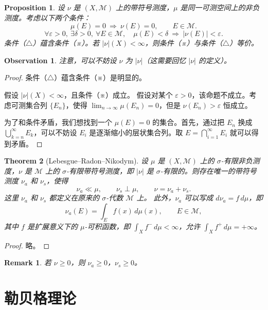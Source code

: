 \documentclass[12pt,letterpaper,twoside,openright]{ctexbook}
\theoremstyle{bluehead}
\newtheorem{theorem}{Theorem}
\newtheorem{proposition}[theorem]{Proposition}
\theoremstyle{olivehead}
\theoremstyle{orangehead}
\theoremstyle{redremark}
\newtheorem*{remark}{Remark}
\newtheorem*{observation}{Observation}
\begin{document}
\begin{proposition}
设 $\nu$ 是 $(X,\mathcal M)$ 上的带符号测度，$\mu$ 是同一可测空间上的非负测度。考虑以下两个条件：
\begin{equation*}
\mu(E)=0\ \Longrightarrow\ \nu(E)=0,
\qquad E\in\mathcal M.\tag{※}
\end{equation*}
\begin{equation*}
\forall\varepsilon>0,\ \exists\delta>0,\ \forall E\in\mathcal M,
\quad\mu(E)<\delta\ \Longrightarrow\ |\nu(E)|<\varepsilon.\tag{$\triangle$}
\end{equation*}
条件（$\triangle$）蕴含条件（※）。若 $|\nu|(X)<\infty$，则条件（※）与条件（$\triangle$）等价。
\end{proposition}
\begin{observation}
注意，可以不妨设 $\nu$ 为 $|\nu|$（这需要回忆 $|\nu|$ 的定义）。
\end{observation}
\begin{proof}
条件（$\triangle$）蕴含条件（※）是明显的。

假设 $|\nu|(X)<\infty$，且条件（※）成立。
假设对某个 $\varepsilon>0$，该命题不成立。考虑可测集合列 $\{E_n\}$，使得 $\lim_{n\to\infty}\mu(E_n)=0$，但是 $\nu(E_n)>\varepsilon$ 恒成立。

为了和条件矛盾，我们想找到一个 $\mu(E)=0$ 的集合。首先，通过把 $E_n$ 换成 $\bigcup_{k=n}^{\infty}E_k$，可以不妨设 $E_i$ 是逐渐缩小的层状集合列。取 $E=\bigcap_{i=1}^{\infty}E_i$ 就可以得到矛盾。
\end{proof}
\begin{theorem}[Lebesgue--Radon--Nikodym]\label{thm:lebesgue-radon-nikodym}
设 $\mu$ 是 $(X,\mathcal M)$ 上的 $\sigma$-有限非负测度，$\nu$ 是 $\mathcal M$ 上的 $\sigma$-有限带符号测度，即 $|\nu|$ 是 $\sigma$-有限的。则存在唯一的带符号测度 $\nu_a$ 和 $\nu_s$，使得
\[
\nu_a\ll\mu,\qquad
\nu_s\perp\mu,\qquad
\nu=\nu_a+\nu_s.
\]
这里 $\nu_a$ 和 $\nu_s$ 都定义在原来的 $\sigma$-代数 $\mathcal M$ 上。
此外，$\nu_a$ 可以写成 $d\nu_a=f\,d\mu$，即
\[
\nu_a(E)=\int_E f(x)\,d\mu(x),\qquad E\in\mathcal M,
\]
其中 $f$ 是扩展意义下的 $\mu$-可积函数，即 $\int_X f^-\,d\mu<\infty$，允许 $\int_X f^+\,d\mu=+\infty$。
\end{theorem}
\begin{proof}
略。
\end{proof}
\begin{remark}
若 $\nu\geq0$，则 $\nu_a\geq0$，$\nu_s\geq0$。
\end{remark}
\chapter{勒贝格理论}
\end{document}
